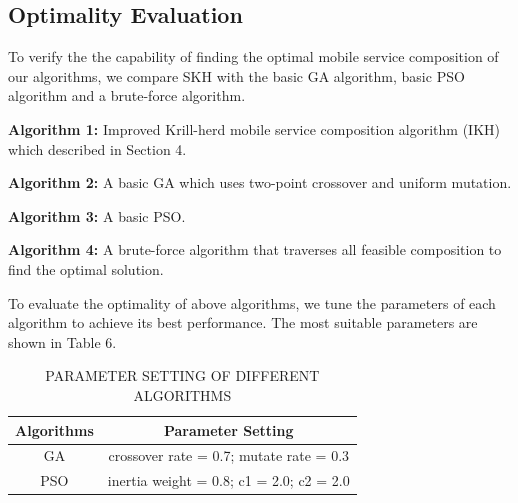 \documentclass[10pt,journal,compsoc]{IEEEtran}
\begin{document}
\subsection{Optimality Evaluation}
To verify the the capability of finding the optimal mobile service composition of our algorithms, we compare SKH with the basic GA algorithm, basic PSO algorithm and a brute-force algorithm.

\textbf{Algorithm 1:} Improved Krill-herd mobile service composition algorithm (IKH) which described in Section 4.

\textbf{Algorithm 2:} A basic GA which uses two-point crossover and uniform mutation.

\textbf{Algorithm 3:} A basic PSO.

\textbf{Algorithm 4:} A brute-force algorithm that traverses all feasible composition to find the optimal solution.

To evaluate the optimality of above algorithms, we tune the parameters of each algorithm to achieve its best performance. The most suitable parameters are shown in Table 6.

\begin{table}[!t]
\renewcommand{\arraystretch}{1.3}
\caption{PARAMETER SETTING OF DIFFERENT ALGORITHMS}
\label{table_example}
\centering
\begin{tabular}{cc}
\hline
\bfseries Algorithms & \bfseries Parameter Setting \\
\hline
GA  & crossover rate = 0.7; mutate rate = 0.3 \\
PSO & inertia weight = 0.8; c1 = 2.0; c2 = 2.0 \\
\hline
\end{tabular}
\end{table}
\end{document}
